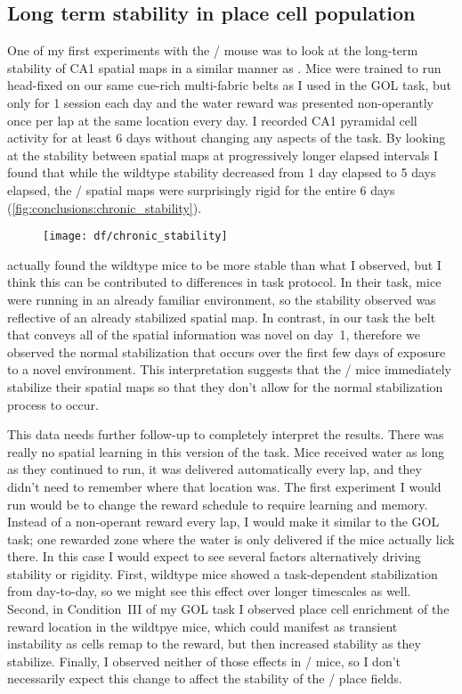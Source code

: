 \subsection{Long term stability in place cell population}
One of my first experiments with the \df/ mouse was to look at the long-term stability of CA1 spatial maps in a similar manner as \citeauthor{Ziv2013}.
Mice were trained to run head-fixed on our same cue-rich multi-fabric belts as I used in the \ac{GOL} task, but only for 1 session each day and the water reward was presented non-operantly once per lap at the same location every day.
I recorded CA1 pyramidal cell activity for at least 6 days without changing any aspects of the task.
By looking at the stability between spatial maps at progressively longer elapsed intervals I found that while the wildtype stability decreased from 1 day elapsed to 5 days elapsed, the \df/ spatial maps were surprisingly rigid for the entire 6 days (\autoref{fig:conclusions:chronic_stability}).

\begin{figure}
	\centering
	\texttt{[image: df/chronic\_stability]}
	\caption{}
	\label{fig:conclusions:chronic_stability}
\end{figure}

\citeauthor{Ziv2013} actually found the wildtype mice to be more stable than what I observed, but I think this can be contributed to differences in task protocol.
In their task, mice were running in an already familiar environment, so the stability observed was reflective of an already stabilized spatial map.
In contrast, in our task the belt that conveys all of the spatial information was novel on day~1, therefore we observed the normal stabilization that occurs over the first few days of exposure to a novel environment.
This interpretation suggests that the \df/ mice immediately stabilize their spatial maps so that they don't allow for the normal stabilization process to occur.

This data needs further follow-up to completely interpret the results.
There was really no spatial learning in this version of the task.
Mice received water as long as they continued to run, it was delivered automatically every lap, and they didn't need to remember where that location was.
The first experiment I would run would be to change the reward schedule to require learning and memory.
Instead of a non-operant reward every lap, I would make it similar to the \ac{GOL} task; one rewarded zone where the water is only delivered if the mice actually lick there.
In this case I would expect to see several factors alternatively driving stability or rigidity.
First, wildtype mice showed a task-dependent stabilization from day-to-day, so we might see this effect over longer timescales as well.
Second, in Condition~III of my \ac{GOL} task I observed place cell enrichment of the reward location in the wildtpye mice, which could manifest as transient instability as cells remap to the reward, but then increased stability as they stabilize.
Finally, I observed neither of those effects in \df/ mice, so I don't necessarily expect this change to affect the stability of the \df/ place fields.

